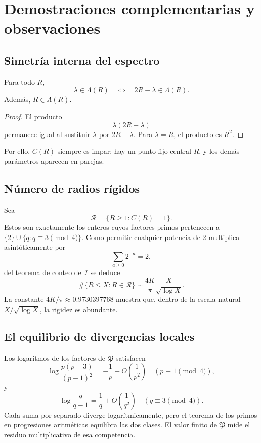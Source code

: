 \documentclass[11pt,a4paper,openany]{report}
\newcommand{\Iset}{\mathcal{I}}
\newcommand{\Lam}{\Lambda}
\begin{document}
\chapter{Demostraciones complementarias y observaciones}

\section{Simetría interna del espectro}

\begin{proposition}
Para todo \(R\),
\[
 \lambda\in\Lam(R)
 \quad\Longleftrightarrow\quad
 2R-\lambda\in\Lam(R).
\]
Además, \(R\in\Lam(R)\).
\end{proposition}

\begin{proof}
El producto
\[
 \lambda(2R-\lambda)
\]
permanece igual al sustituir \(\lambda\) por \(2R-\lambda\). Para \(\lambda=R\), el producto es \(R^2\).
\end{proof}

Por ello, \(C(R)\) siempre es impar: hay un punto fijo central \(R\), y los demás parámetros aparecen en parejas.

\section{Número de radios rígidos}

Sea
\[
 \mathcal R=\{R\ge1:C(R)=1\}.
\]
Estos son exactamente los enteros cuyos factores primos pertenecen a \(\{2\}\cup\{q:q\equiv3\pmod4\}\). Como permitir cualquier potencia de \(2\) multiplica asintóticamente por
\[
 \sum_{a\ge0}2^{-a}=2,
\]
del teorema de conteo de \(\Iset\) se deduce
\begin{equation}
 \#\{R\le X:R\in\mathcal R\}
 \sim\frac{4K}{\pi}\frac{X}{\sqrt{\log X}}.
 \label{eq:rigid-count}
\end{equation}
La constante \(4K/\pi\approx0.9730397768\) muestra que, dentro de la escala natural \(X/\sqrt{\log X}\), la rigidez es abundante.

\section{El equilibrio de divergencias locales}

Los logaritmos de los factores de \(\mathfrak P\) satisfacen
\[
 \log\frac{p(p-3)}{(p-1)^2}
 =-\frac1p+O\left(\frac1{p^2}\right)
 \quad(p\equiv1\pmod4),
\]
y
\[
 \log\frac{q}{q-1}
 =\frac1q+O\left(\frac1{q^2}\right)
 \quad(q\equiv3\pmod4).
\]
Cada suma por separado diverge logarítmicamente, pero el teorema de los primos en progresiones aritméticas equilibra las dos clases. El valor finito de \(\mathfrak P\) mide el residuo multiplicativo de esa competencia.
\end{document}
